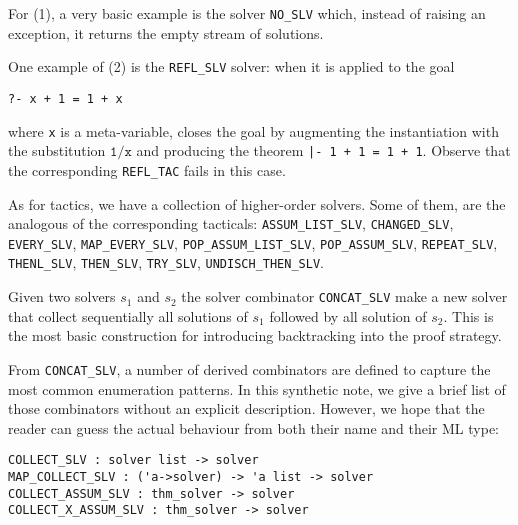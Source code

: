 For (1), a very basic example is the solver \verb|NO_SLV| which,
instead of raising an exception, it returns the empty stream of
solutions.

One example of (2) is the \verb|REFL_SLV| solver: when it is applied
to the goal
\begin{verbatim}
?- x + 1 = 1 + x
\end{verbatim}
where \verb|x| is a meta-variable, closes the goal by augmenting the
instantiation with the substitution $\mathtt{1}/\mathtt{x}$ and
producing the theorem \verb!|- 1 + 1 = 1 + 1!.  Observe that the
corresponding \verb|REFL_TAC| fails in this case.

As for tactics, we have a collection of higher-order solvers.  Some of
them, are the analogous of the corresponding tacticals:
\verb|ASSUM_LIST_SLV|,
\verb|CHANGED_SLV|,
\verb|EVERY_SLV|,
\verb|MAP_EVERY_SLV|,
\verb|POP_ASSUM_LIST_SLV|,
\verb|POP_ASSUM_SLV|,
\verb|REPEAT_SLV|,
\verb|THENL_SLV|,
\verb|THEN_SLV|,
\verb|TRY_SLV|,
\verb|UNDISCH_THEN_SLV|.


Given two solvers $s_1$ and $s_2$ the solver combinator
\verb|CONCAT_SLV| make a new solver that collect sequentially all
solutions of $s_1$ followed by all solution of $s_2$.  This is the
most basic construction for introducing backtracking into the proof
strategy.

From \verb|CONCAT_SLV|, a number of derived combinators are defined to
capture the most common enumeration patterns.  In this synthetic note,
we give a brief list of those combinators without an explicit
description. However, we hope that the reader can guess the actual
behaviour from both their name and their ML type:
\begin{verbatim}
COLLECT_SLV : solver list -> solver
MAP_COLLECT_SLV : ('a->solver) -> 'a list -> solver
COLLECT_ASSUM_SLV : thm_solver -> solver
COLLECT_X_ASSUM_SLV : thm_solver -> solver
\end{verbatim}



